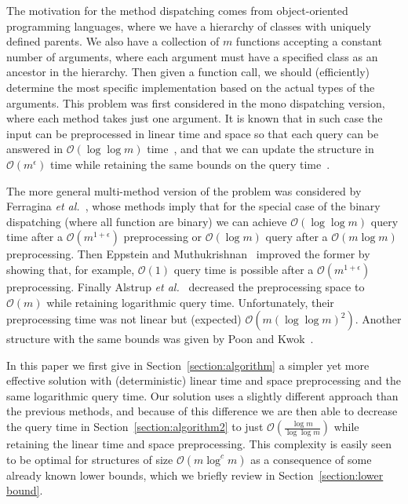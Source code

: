 \documentclass[runningheads]{llncs}
\begin{document}
The motivation for the method dispatching comes from object-oriented programming languages, where we have a hierarchy of classes with uniquely defined parents. We also have a collection of $m$ functions accepting a constant number of arguments, where each argument must have a specified class as an ancestor in the hierarchy. Then given a function call, we should (efficiently) determine the most specific implementation based on the actual types of the arguments. This problem was first considered in the mono dispatching version, where each method takes just one argument. It is known that in such case the input can be preprocessed in linear time and space so that each query can be answered in $\mathcal{O}(\log\log m)$ time~\cite{Muthukrishnan}, and that we can update the structure in $\mathcal{O}(m^\epsilon)$ time while retaining the same bounds on the query time~\cite{Ferragina}.

The more general multi-method version of the problem was considered by Ferragina \emph{et al.}~\cite{Ferragina}, whose methods imply that for the special case of the binary dispatching (where all function are binary) we can achieve $\mathcal{O}(\log\log m)$ query time after a $\mathcal{O}(m^{1+\epsilon})$ preprocessing or $\mathcal{O}(\log m)$ query after a $\mathcal{O}(m\log m)$ preprocessing. Then Eppstein and Muthukrishnan~\cite{Eppstein} improved the former by showing that, for example, $\mathcal{O}(1)$ query time is possible after a $\mathcal{O}(m^{1+\epsilon})$ preprocessing. Finally Alstrup \emph{et al.}~\cite{Alstrup} decreased the preprocessing space to $\mathcal{O}(m)$ while retaining logarithmic query time. Unfortunately, their preprocessing time was not linear but (expected) $\mathcal{O}(m(\log\log m)^{2})$. Another structure with the same bounds was given by Poon and Kwok~\cite{Poon}. 

In this paper we first give in Section~\ref{section:algorithm} a simpler yet more effective solution with (deterministic) linear time and space preprocessing and the same logarithmic query time. Our solution uses a slightly different approach than the previous methods, and because of this difference we are then able to decrease the query time in Section~\ref{section:algorithm2} to just $\mathcal{O}(\frac{\log m}{\log\log m})$ while retaining the linear time and space preprocessing. This complexity is easily seen to be optimal for structures of size $\mathcal{O}(m\log^{c}m)$ as a consequence of some already known lower bounds, which we briefly review in Section~\ref{section:lower bound}.
\end{document}
